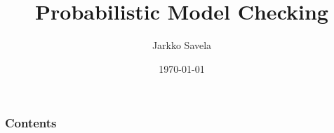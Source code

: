 \documentclass[handout]{beamer}
\title[Probabilistic MC]{Probabilistic Model Checking} %
\author{Jarkko Savela} %
\institute{University of Helsinki} %
\date{\today} %
\begin{document}
\begin{frame}
\titlepage %
\end{frame}

\begin{frame}
\frametitle{Contents} %
\tableofcontents %
\end{frame}



\end{document}
